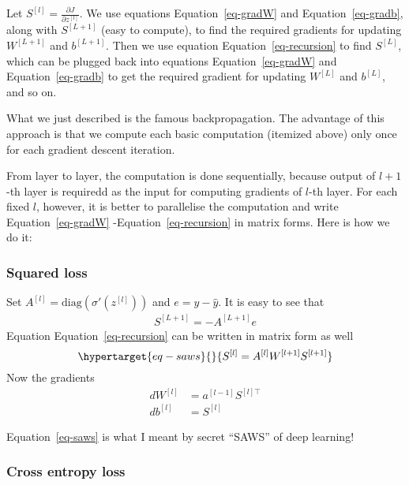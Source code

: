 \documentclass[
  letterpaper,
  DIV=11,
  numbers=noendperiod]{scrartcl}
\begin{document}
Let \(S^{[l]} = \frac{\partial J}{\partial z^{[l]}}\). We use equations
Equation~\ref{eq-gradW} and Equation~\ref{eq-gradb}, along with
\(S^{[L+1]}\) (easy to compute), to find the required gradients for
updating \(W^{[L+1]}\) and \(b^{[L+1]}\). Then we use equation
Equation~\ref{eq-recursion} to find \(S^{[L]}\), which can be plugged
back into equations Equation~\ref{eq-gradW} and Equation~\ref{eq-gradb}
to get the required gradient for updating \(W^{[L]}\) and \(b^{[L]}\),
and so on.

What we just described is the famous backpropagation. The advantage of
this approach is that we compute each basic computation (itemized above)
only once for each gradient descent iteration.

From layer to layer, the computation is done sequentially, because
output of \(l+1\)-th layer is requiredd as the input for computing
gradients of \(l\)-th layer. For each fixed \(l\), however, it is better
to parallelise the computation and write Equation~\ref{eq-gradW}
-Equation~\ref{eq-recursion} in matrix forms. Here is how we do it:

\hypertarget{squared-loss}{%
\subsubsection{Squared loss}\label{squared-loss}}

Set \(A^{[l]}=\mathrm{diag}(\sigma'(z^{[l]}))\) and \(e = y - \hat y\).
It is easy to see that \begin{align*}
    S^{[L+1]} = - A^{[L+1]} e 
\end{align*} Equation Equation~\ref{eq-recursion} can be written in
matrix form as well \begin{equation}\protect\hypertarget{eq-saws}{}{
S^{[l]} = A^{[l]} W^{[l+1]} S^{[l+1]}
}\label{eq-saws}\end{equation} Now the gradients \begin{align*}
    dW^{[l]} &= a^{[l-1]} S^{[l]\top} \\
    db^{[l]} &= S^{[l]}
\end{align*}

Equation~\ref{eq-saws} is what I meant by secret ``SAWS'' of deep
learning!

\hypertarget{cross-entropy-loss}{%
\subsubsection{Cross entropy loss}\label{cross-entropy-loss}}
\end{document}
